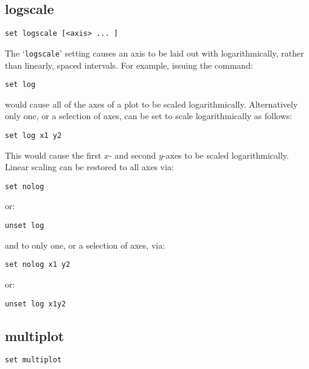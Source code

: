 \documentclass[a4paper,onecolumn,11pt]{book}
\begin{document}
\subsection{logscale}

\begin{verbatim}
set logscale [<axis> ... ]
\end{verbatim}

The `{\tt logscale}' setting causes an axis to be laid out with logarithmically,
rather than linearly, spaced intervals.  For example, issuing the command:

\begin{verbatim}
set log
\end{verbatim}

\noindent would cause all of the axes of a plot to be scaled logarithmically. Alternatively
only one, or a selection of axes, can be set to scale logarithmically as
follows:

\begin{verbatim}
set log x1 y2
\end{verbatim}

This would cause the first $x$- and second $y$-axes to be scaled logarithmically.
Linear scaling can be restored to all axes via:

\begin{verbatim}
set nolog
\end{verbatim}

\noindent or:

\begin{verbatim}
unset log
\end{verbatim}

\noindent and to only one, or a selection of axes, via:

\begin{verbatim}
set nolog x1 y2
\end{verbatim}

\noindent or:

\begin{verbatim}
unset log x1y2
\end{verbatim}
   

\subsection{multiplot}

\begin{verbatim}
set multiplot
\end{verbatim}
\end{document}
